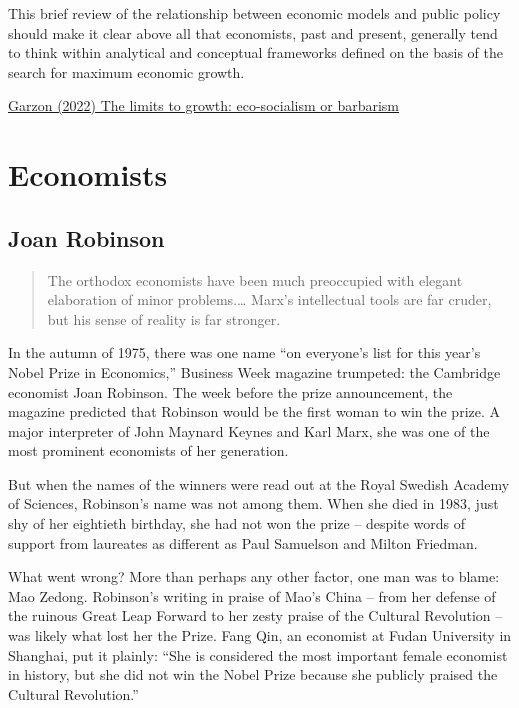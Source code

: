 \documentclass[
]{book}
\begin{document}
This brief review of the relationship between economic models and public policy should make it clear above all that economists, past and present, generally tend to think within analytical and conceptual frameworks defined on the basis of the search for maximum economic growth.

\href{https://la-u.org/the-limits-to-growth-eco-socialism-or-barbarism/}{Garzon (2022) The limits to growth: eco-socialism or barbarism}

\hypertarget{economists}{%
\chapter{Economists}\label{economists}}

\hypertarget{joan-robinson}{%
\section{Joan Robinson}\label{joan-robinson}}

\begin{quote}
The orthodox economists have been much preoccupied with elegant elaboration of minor
problems.\ldots{} Marx's intellectual tools are far cruder, but his sense of reality is far stronger.
\end{quote}

In the autumn of 1975, there was one name ``on everyone's list for this year's Nobel Prize in Economics,'' Business Week magazine trumpeted: the Cambridge economist Joan Robinson. The week before the prize announcement, the magazine predicted that Robinson would be the first woman to win the prize. A major interpreter of John Maynard Keynes and Karl Marx, she was one of the most prominent economists of her generation.

But when the names of the winners were read out at the Royal Swedish Academy of Sciences, Robinson's name was not among them. When she died in 1983, just shy of her eightieth birthday, she had not won the prize -- despite words of support from laureates as different as Paul Samuelson and Milton Friedman.

What went wrong? More than perhaps any other factor, one man was to blame: Mao Zedong. Robinson's writing in praise of Mao's China -- from her defense of the ruinous Great Leap Forward to her zesty praise of the Cultural Revolution -- was likely what lost her the Prize. Fang Qin, an economist at Fudan University in Shanghai, put it plainly: ``She is considered the most important female economist in history, but she did not win the Nobel Prize because she publicly praised the Cultural Revolution.''
\end{document}
